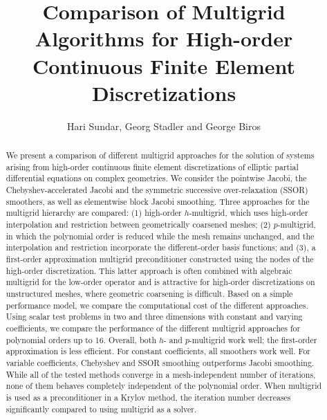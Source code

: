 \documentclass[times]{nlaauth}
\begin{document}
\title{Comparison of Multigrid Algorithms for High-order Continuous Finite Element Discretizations}
\author{Hari Sundar\corrauth, Georg Stadler and George Biros}


\address{
  School of Computing,
  University of Utah, Salt Lake City, UT\break
{}Courant Institute of Mathematical Sciences, New York University, New
York, NY\break
  Institute for Computational Engineering and Sciences,
The  University of Texas at Austin, Austin, TX\break
{}Department of Mechanical Engineering,
The University of Texas at Austin, Austin, TX
}

\begin{abstract}
We present a comparison of different multigrid approaches for the
solution of systems arising from high-order continuous finite element
discretizations of elliptic partial differential equations on complex
geometries.  We consider the pointwise Jacobi, the
Chebyshev-accelerated Jacobi and the symmetric successive
over-relaxation (SSOR) smoothers, as well as elementwise block Jacobi
smoothing. Three approaches for the multigrid hierarchy are compared:
(1) high-order $h$-multigrid, which uses high-order interpolation and
restriction between geometrically coarsened meshes; (2) $p$-multigrid,
in which the polynomial order is reduced while the mesh remains
unchanged, and the interpolation and restriction incorporate the
different-order basis functions; and (3), a first-order approximation
multigrid preconditioner constructed using the nodes of the high-order
discretization.  This latter approach is often combined with algebraic
multigrid for the low-order operator and is attractive for high-order
discretizations on unstructured meshes, where geometric coarsening is
difficult.  Based on a simple performance model, we compare the
computational cost of the different approaches.  Using scalar test
problems in two and three dimensions with constant and varying
coefficients, we compare the performance of the different multigrid
approaches for polynomial orders up to 16. Overall, both $h$- and
$p$-multigrid work well; the first-order approximation is less
efficient. For constant coefficients, all smoothers work well. For
variable coefficients, Chebyshev and SSOR smoothing outperforms Jacobi
smoothing.  While all of the tested methods converge in a
mesh-independent number of iterations, none of them behaves completely
independent of the polynomial order.  When multigrid is used as a
preconditioner in a Krylov method, the iteration number decreases
significantly
compared to using multigrid as a solver.
\end{abstract}
\end{document}
